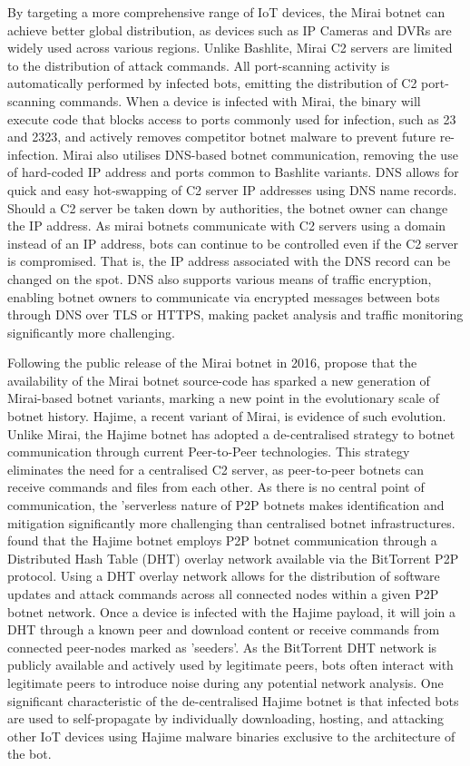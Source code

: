 By targeting a more comprehensive range of IoT devices, the Mirai botnet can achieve better global distribution, as devices such as IP Cameras and DVRs are widely used across various regions. Unlike Bashlite, Mirai C2 servers are limited to the distribution of attack commands. All port-scanning activity is automatically performed by infected bots, emitting the distribution of C2 port-scanning commands. When a device is infected with Mirai, the binary will execute code that blocks access to ports commonly used for infection, such as 23 and 2323, and actively removes competitor botnet malware to prevent future re-infection. Mirai also utilises DNS-based botnet communication, removing the use of hard-coded IP address and ports common to Bashlite variants. DNS allows for quick and easy hot-swapping of C2 server IP addresses using DNS name records. Should a C2 server be taken down by authorities, the botnet owner can change the IP address. As mirai botnets communicate with C2 servers using a domain instead of an IP address, bots can continue to be controlled even if the C2 server is compromised. That is, the IP address associated with the DNS record can be changed on the spot. DNS also supports various means of traffic encryption, enabling botnet owners to communicate via encrypted messages between bots through DNS over TLS or HTTPS, making packet analysis and traffic monitoring significantly more challenging. 

Following the public release of the Mirai botnet in 2016, \citet{Antonakakis2017} propose that the availability of the Mirai botnet source-code has sparked a new generation of Mirai-based botnet variants, marking a new point in the evolutionary scale of botnet history. Hajime, a recent variant of Mirai, is evidence of such evolution. Unlike Mirai, the Hajime botnet has adopted a de-centralised strategy to botnet communication through current Peer-to-Peer technologies. This strategy eliminates the need for a centralised C2 server, as peer-to-peer botnets can receive commands and files from each other. As there is no central point of communication, the 'serverless nature of P2P botnets makes identification and mitigation significantly more challenging than centralised botnet infrastructures. \citet{Herwig2019} found that the Hajime botnet employs P2P botnet communication through a Distributed Hash Table (DHT) overlay network available via the BitTorrent P2P protocol. Using a DHT overlay network allows for the distribution of software updates and attack commands across all connected nodes within a given P2P botnet network. Once a device is infected with the Hajime payload, it will join a DHT through a known peer and download content or receive commands from connected peer-nodes marked as 'seeders'. As the BitTorrent DHT network is publicly available and actively used by legitimate peers, bots often interact with legitimate peers to introduce noise during any potential network analysis. One significant characteristic of the de-centralised Hajime botnet is that infected bots are used to self-propagate by individually downloading, hosting, and attacking other IoT devices using Hajime malware binaries exclusive to the architecture of the bot.


